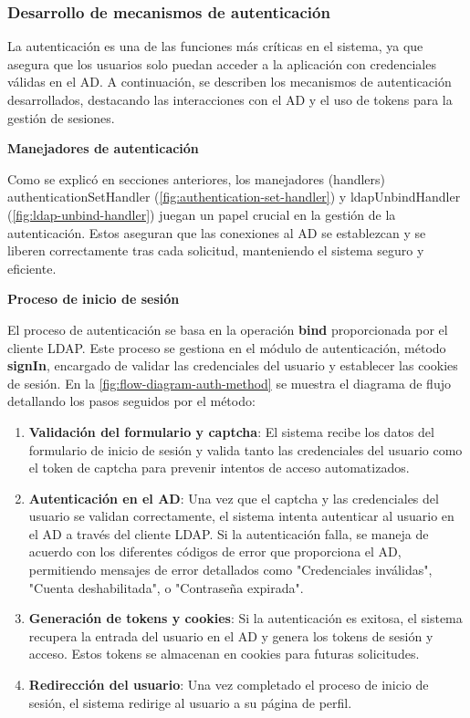 \subsubsection{Desarrollo de mecanismos de autenticación}

La autenticación es una de las funciones más críticas en el sistema, ya que asegura que los usuarios solo puedan acceder a la aplicación con credenciales válidas en el AD. A continuación, se describen los mecanismos de autenticación desarrollados, destacando las interacciones con el AD y el uso de tokens para la gestión de sesiones.

\textbf{Manejadores de autenticación}

Como se explicó en secciones anteriores, los manejadores (handlers) authenticationSetHandler (\autoref{fig:authentication-set-handler})  y ldapUnbindHandler (\autoref{fig:ldap-unbind-handler}) juegan un papel crucial en la gestión de la autenticación. Estos aseguran que las conexiones al AD se establezcan y se liberen correctamente tras cada solicitud, manteniendo el sistema seguro y eficiente.

\textbf{Proceso de inicio de sesión}

El proceso de autenticación se basa en la operación \textbf{bind} proporcionada por el cliente LDAP. Este proceso se gestiona en el módulo de autenticación, método \textbf{signIn}, encargado de validar las credenciales del usuario y establecer las cookies de sesión. En la \autoref{fig:flow-diagram-auth-method} se muestra el diagrama de flujo detallando los pasos seguidos por el método:
\begin{enumerate}
    \item \textbf{Validación del formulario y captcha}: El sistema recibe los datos del formulario de inicio de sesión y valida tanto las credenciales del usuario como el token de captcha para prevenir intentos de acceso automatizados.
    \item \textbf{Autenticación en el AD}: Una vez que el captcha y las credenciales del usuario se validan correctamente, el sistema intenta autenticar al usuario en el AD a través del cliente LDAP. Si la autenticación falla, se maneja de acuerdo con los diferentes códigos de error que proporciona el AD, permitiendo mensajes de error detallados como "Credenciales inválidas", "Cuenta deshabilitada", o "Contraseña expirada".
    \item \textbf{Generación de tokens y cookies}: Si la autenticación es exitosa, el sistema recupera la entrada del usuario en el AD y genera los tokens de sesión y acceso. Estos tokens se almacenan en cookies para futuras solicitudes.
    \item \textbf{Redirección del usuario}: Una vez completado el proceso de inicio de sesión, el sistema redirige al usuario a su página de perfil.
\end{enumerate}

